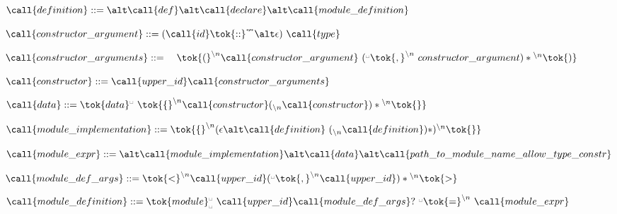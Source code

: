  
   \item $\call{definition} ::= \\
   \alt \call{def}\\
   \alt \call{declare}\\
   \alt \call{module\_definition}$
    
 
  \item $\call{constructor\_argument} ::=
    ( \call{id} \tok{::}^\nleftrightarrow \alt \epsilon)\ \call{type}$
  \item $\call{constructor\_arguments} ::=\\
   \quad\tok{(}^{\backslash{}n} \call{constructor\_argument}\ ( {}^{\textrm{\textvisiblespace}}\tok{,}^{\backslash{}n}\ {constructor\_argument} )* {}^{\backslash{}n}\tok{)}$
   
 
   \item $\call{constructor} ::= \call{upper\_id}\call{constructor\_arguments}$
    

  \item $\call{data} ::= \tok{data}^{\textrm{\textvisiblespace}}\ \tok{\{}^{\backslash{}n} \call{constructor} ({}_{\backslash{}n} \call{constructor} )* {}^{\backslash{}n}\tok{\}}$
   
 
   \item $\call{module\_implementation} ::= \tok{\{}^{\backslash{}n} (\epsilon \alt
   \call{definition}\ ({}_{\backslash{}n}\call{definition})* ) {}^{\backslash{}n}\tok{\}}$
    
 
   \item $\call{module\_expr} ::=\\
   \alt \call{module\_implementation}\\
   \alt \call{data}\\
   \alt \call{path\_to\_module\_name\_allow\_type\_constr}$
    
 
   \item $\call{module\_def\_args} ::= \tok{<}^{\backslash{}n} \call{upper\_id}
   ({}^{\textrm{\textvisiblespace}}\tok{,}^{\backslash{}n} \call{upper\_id})* {}^{\backslash{}n}\tok{>}$\\
   \item $\call{module\_definition} ::=
   \tok{module}_{\textrm{\textvisiblespace}}^{\textrm{\textvisiblespace}}\ \call{upper\_id}\call{module\_def\_args}?\ {}^{\textrm{\textvisiblespace}}\tok{=}^{\backslash{}n}\ \call{module\_expr}$
   
